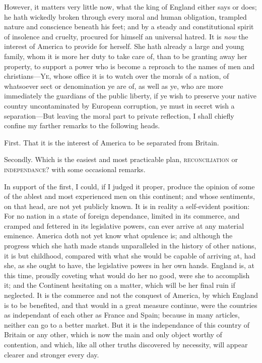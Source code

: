 \documentclass[12pt, twocolumn]{book}
\begin{document}
    However, it matters very little now, what the king of England either says or does; he hath wickedly broken through every moral and human obligation, trampled nature and conscience beneath his feet; and by a steady and constitutional spirit of insolence and cruelty, procured for himself an universal hatred. It is \textit{now} the interest of America to provide for herself. She hath already a large and young family, whom it is more her duty to take care of, than to be granting away her property, to support a power who is become a reproach to the names of men and christians—\textsc{Ye}, whose office it is to watch over the morals of a nation, of whatsoever sect or denomination ye are of, as well as ye, who are more immediately the guardians of the public liberty, if ye wish to preserve your native country uncontaminated by European corruption, ye must in secret wish a separation—But leaving the moral part to private reflection, I shall chiefly confine my farther remarks to the following heads.

    First. That it is the interest of America to be separated from Britain.

    Secondly. Which is the easiest and most practicable plan, \textsc{reconciliation} or \textsc{independance}? with some occasional remarks.

    In support of the first, I could, if I judged it proper, produce the opinion of some of the ablest and most experienced men on this continent; and whose sentiments, on that head, are not yet publicly known. It is in reality a self-evident position: For no nation in a state of foreign dependance, limited in its commerce, and cramped and fettered in its legislative powers, can ever arrive at any material eminence. America doth not yet know what opulence is; and although the progress which she hath made stands unparalleled in the history of other nations, it is but childhood, compared with what she would be capable of arriving at, had she, as she ought to have, the legislative powers in her own hands. England is, at this time, proudly coveting what would do her no good, were she to accomplish it; and the Continent hesitating on a matter, which will be her final ruin if neglected. It is the commerce and not the conquest of America, by which England is to be benefited, and that would in a great measure continue, were the countries as independant of each other as France and Spain; because in many articles, neither can go to a better market. But it is the independance of this country of Britain or any other, which is now the main and only object worthy of contention, and which, like all other truths discovered by necessity, will appear clearer and stronger every day.
\end{document}
